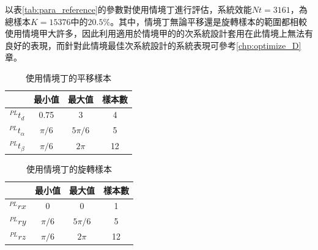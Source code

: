 以表\ref{tab:para_reference}的參數對使用情境丁進行評估，系統效能$Nt=3161$，為總樣本$K=15376$中的$20.5\%$。其中，情境丁無論平移還是旋轉樣本的範圍都相較使用情境甲大許多，因此利用適用於情境甲的的次系統設計套用在此情境上無法有良好的表現，而針對此情境最佳次系統設計的系統表現可參考\ref{chp:optimize_D}章。

\begin{table}[htpb]
    \begin{center}
      \caption{使用情境丁的平移樣本}
      \label{tab:C_translate}
      \begin{tabular}{c|c|c|c} %
         & \textbf{最小值} & \textbf{最大值}&\textbf{樣本數}\\
        \hline
        $^{PL}t_d$ & 0.75 &3&4\\
        $^{PL}t_{\alpha}$ & $\pi/6$ & $5\pi/6$ & 5\\
        $^{PL}t_{\beta}$ & $\pi/6$ & $2\pi$ &12\\
      \end{tabular}
    \end{center}
  \end{table}

  \begin{table}[htpb]
    \begin{center}
      \caption{使用情境丁的旋轉樣本}
      \label{tab:C_translate}
      \begin{tabular}{c|c|c|c} %
         & \textbf{最小值} & \textbf{最大值}&\textbf{樣本數}\\
        \hline
        $^{PL}rx$ & 0 &0&1\\
        $^{PL}ry$ & $\pi/6$ & $5\pi/6$ & 5\\
        $^{PL}rz$ & $\pi/6$ & $2\pi$ &12\\
      \end{tabular}
    \end{center}
  \end{table}

